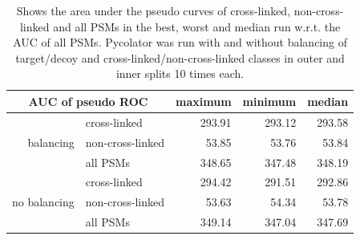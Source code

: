 \begin{table}[htbp]
	\normalsize
	\centering	
	\caption[Area under the pseudo ROC curves with and without balancing of classes]{Shows the area under the pseudo curves of cross-linked, non-cross-linked and all PSMs in the best, worst and median run w.r.t. the AUC of all PSMs. Pycolator was run with and without balancing of target/decoy and cross-linked/non-cross-linked classes in outer and inner splits 10 times each.}
	\begin{tabular}{r|l||rrr}
		\multicolumn{2}{c}{AUC of pseudo ROC} & maximum & minimum & median \\
		\hline
		\multirow{3}[0]{*}{balancing} & cross-linked & 293.91 & 293.12 & 293.58 \\
		& non-cross-linked & 53.85 & 53.76 & 53.84 \\
		& all PSMs & 348.65 & 347.48 & 348.19 \\
		\hline
		\multirow{3}[0]{*}{no balancing} & cross-linked & 294.42 & 291.51 & 292.86 \\
		& non-cross-linked & 53.63 & 54.34 & 53.78 \\
		& all PSMs & 349.14 & 347.04 & 347.69 \\
	\end{tabular}
	\label{tab:results:maxminmedian}
\end{table}
\renewcommand{\baselinestretch}{1}

